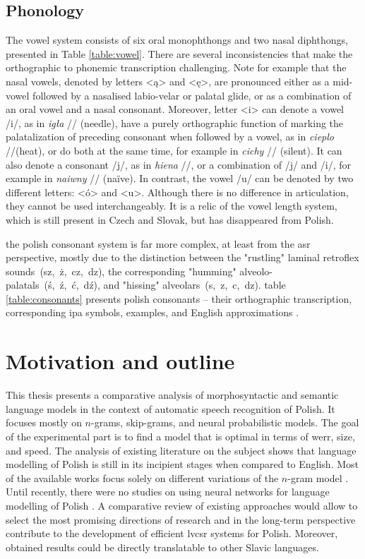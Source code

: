 \subsection{Phonology}
The vowel system consists of six oral monophthongs and two nasal diphthongs, presented in Table \ref{table:vowel}. There are several inconsistencies that make the orthographic to phonemic transcription challenging. Note for example that the nasal vowels, denoted by letters <ą> and <ę>, are pronounced either as a mid-vowel followed by a nasalised labio-velar or palatal glide, or as a combination of an oral vowel and a nasal consonant. Moreover, letter <i> can denote a vowel /i/, as in \textit{igła} // (needle), have a purely orthographic function of marking the palatalization of preceding consonant when followed by a vowel, as in \textit{cieplo} //(heat), or do both at the same time, for example in \textit{cichy} // (silent). It can also denote a consonant /j/, as in \textit{hiena} //, or a combination of /j/ and /i/, for example in \textit{naiwny} // (naïve). In contrast, the vowel /u/ can be denoted by two different letters: <ó> and <u>. Although there is no difference in articulation, they cannot be used interchangeably. It is a relic of the vowel length system, which is still present in Czech and Slovak, but has disappeared from Polish.

the polish consonant system is far more complex, at least from the \gls{asr} perspective, mostly due to the distinction between the "rustling" laminal retroflex sounds~(sz,~ż,~cz,~dz), the corresponding "humming" alveolo-palatals~(ś,~ź,~ć,~dź), and "hissing" alveolars~(s,~z,~c,~dz). table \ref{table:consonants} presents polish consonants -- their orthographic transcription, corresponding \gls{ipa} symbols, examples, and English approximations \cite{gussmann2007phonology}. 

\section{Motivation and outline}
\label{section:outline}
This thesis presents a comparative analysis of morphosyntactic and semantic language models in the context of automatic speech recognition of Polish. It focuses mostly on $n$-grams, skip-grams, and neural probabilistic models. The goal of the experimental part is to find a model that is optimal in terms of \gls{werr}, size, and speed. The analysis of existing literature on the subject shows that language modelling of Polish is still in its incipient stages when compared to English. Most of the available works focus solely on different variations of the $n$-gram model \cite{majewski2008syllable, ziolko2011n}. Until recently, there were no studies on using neural networks for language modelling of Polish \cite{gajecki2013modelowanie, brocki2012connectionist}. A comparative review of existing approaches would allow to select the most promising directions of research and in the long-term perspective contribute to the development of efficient \gls{lvcsr} systems for Polish. Moreover, obtained results could be directly translatable to other Slavic languages.

